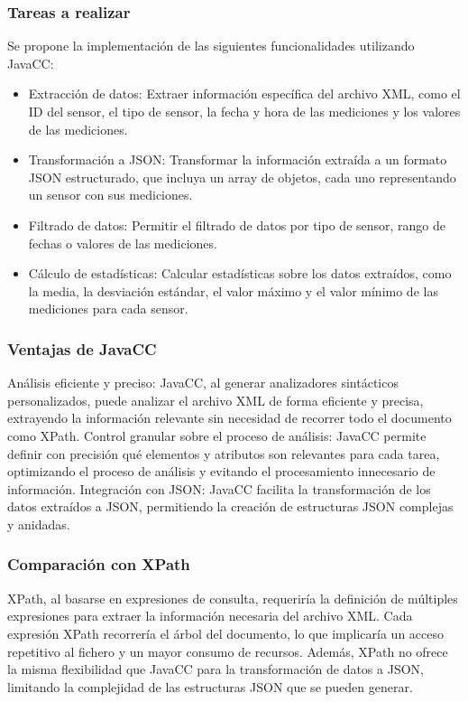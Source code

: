 \subsubsection*{Tareas a realizar}

Se propone la implementación de las siguientes funcionalidades utilizando JavaCC:

\begin{itemize}
  \item Extracción de datos: Extraer información específica del archivo XML, como el ID del sensor, el tipo de sensor, la fecha y hora de las mediciones y los valores de las mediciones.
  \item Transformación a JSON: Transformar la información extraída a un formato JSON estructurado, que incluya un array de objetos, cada uno representando un sensor con sus mediciones.
  \item Filtrado de datos: Permitir el filtrado de datos por tipo de sensor, rango de fechas o valores de las mediciones.
  \item Cálculo de estadísticas: Calcular estadísticas sobre los datos extraídos, como la media, la desviación estándar, el valor máximo y el valor mínimo de las mediciones para cada sensor.
\end{itemize}

\subsubsection{Ventajas de JavaCC}

Análisis eficiente y preciso: JavaCC, al generar analizadores sintácticos personalizados, puede analizar el archivo XML de forma eficiente y precisa, extrayendo la información relevante sin necesidad de recorrer todo el documento como XPath.
Control granular sobre el proceso de análisis: JavaCC permite definir con precisión qué elementos y atributos son relevantes para cada tarea, optimizando el proceso de análisis y evitando el procesamiento innecesario de información.
Integración con JSON: JavaCC facilita la transformación de los datos extraídos a JSON, permitiendo la creación de estructuras JSON complejas y anidadas.

\subsubsection{Comparación con XPath}

XPath, al basarse en expresiones de consulta, requeriría la definición de múltiples expresiones para extraer la información necesaria del archivo XML. Cada expresión XPath recorrería el árbol del documento, lo que implicaría un acceso repetitivo al fichero y un mayor consumo de recursos. Además, XPath no ofrece la misma flexibilidad que JavaCC para la transformación de datos a JSON, limitando la complejidad de las estructuras JSON que se pueden generar.


